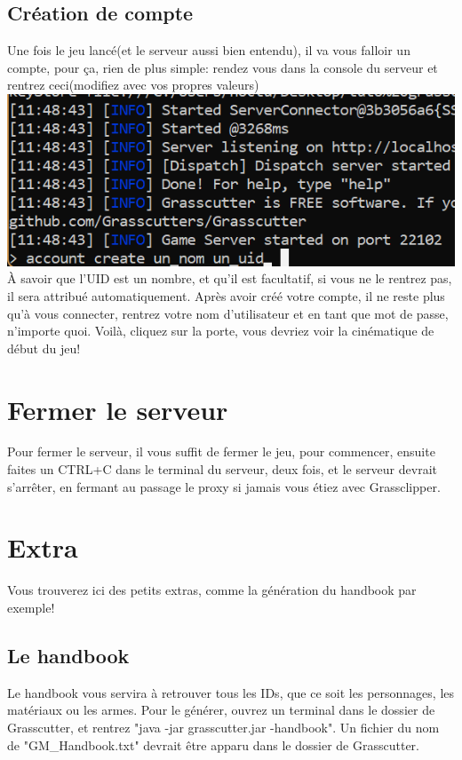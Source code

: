 \documentclass{article}
\begin{document}
\subsection{Création de compte}
Une fois le jeu lancé(et le serveur aussi bien entendu), il va vous falloir un compte, pour ça, rien de plus simple: rendez vous dans la console du serveur et rentrez ceci(modifiez avec vos propres valeurs)\newline
\includegraphics[scale=0.8]{img/account_create.png}\newline
À savoir que l'UID est un nombre, et qu'il est facultatif, si vous ne le rentrez pas, il sera attribué automatiquement.\newline
Après avoir créé votre compte, il ne reste plus qu'à vous connecter, rentrez votre nom d'utilisateur et en tant que mot de passe, n'importe quoi.\newline
Voilà, cliquez sur la porte, vous devriez voir la cinématique de début du jeu!

\hrulefill

\section{Fermer le serveur}
Pour fermer le serveur, il vous suffit de fermer le jeu, pour commencer, ensuite faites un CTRL+C dans le terminal du serveur, deux fois, et le serveur devrait s'arrêter, en fermant au passage le proxy si jamais vous étiez avec Grassclipper.

\hrulefill
\newpage

\section{Extra}
Vous trouverez ici des petits extras, comme la génération du handbook par exemple!

\subsection{Le handbook}
Le handbook vous servira à retrouver tous les IDs, que ce soit les personnages, les matériaux ou les armes.\newline
Pour le générer, ouvrez un terminal dans le dossier de Grasscutter, et rentrez "java -jar grasscutter.jar -handbook". Un fichier du nom de "GM\_Handbook.txt" devrait être apparu dans le dossier de Grasscutter.\newline
\end{document}
